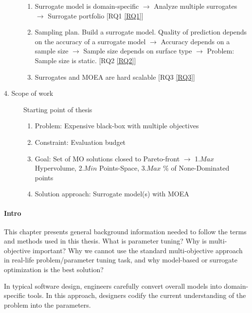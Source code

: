 \begin{blockquote}
\begin{description}
\begin{enumerate}
                    \item Surrogate model is domain-specific $\rightarrow$ Analyze multiple surrogates $\rightarrow$ Surrogate portfolio [RQ1 \ref{RQ1}]
                    \item Sampling plan. Build a surrogate model. Quality of prediction depends on the accuracy of a surrogate model  $\rightarrow$ Accuracy depends on a sample size $\rightarrow$ Sample size depends on surface type $\rightarrow$ Problem: Sample size is static. [RQ2 \ref{RQ2}]
                    \item Surrogates and MOEA are hard scalable [RQ3 \ref{RQ3}]
                \end{enumerate}
            \item[4. Scope of work] Starting point of thesis
                \begin{enumerate}
                    \item Problem: Expensive black-box with multiple objectives
                    \item Constraint: Evaluation budget
                    \item Goal: Set of MO solutions closed to Pareto-front $\rightarrow$ 1.$Max$ Hypervolume, 2.$Min$ Points-Space, 3.$Max$ \% of None-Dominated points 
                    \item Solution approach: Surrogate model(s) with MOEA
                \end{enumerate}
        \end{description}
    \end{blockquote}

    \paragraph{Intro}
    This chapter presents general background information needed to follow the terms and methods used in this thesis. What is parameter tuning? Why is multi-objective important? Why we cannot use the standard multi-objective approach in real-life problem/parameter tuning task, and why model-based or surrogate optimization is the best solution?

    In typical software design, engineers carefully convert overall models into domain-specific tools. In this approach, designers codify the current understanding of the problem into the parameters.

